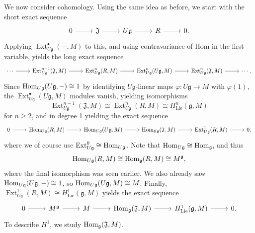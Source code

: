 We now consider cohomology. Using the same idea as before, we start with the short exact sequence
\[\begin{tikzcd}[row sep = 2.5em, column sep = 2.5em]
0\ar[r]  & \mathfrak{J} \ar[r]  & U\mathfrak{g} \ar[r]  & R\ar[r]  & 0.
\end{tikzcd}\]
Applying $\operatorname{Ext}_{U\mathfrak{g} } ^{\bullet} (-,M)$ to this, and using contravariance of Hom in the first variable, yields the long exact sequence
\[\begin{tikzcd}[row sep = 2.5em, column sep = 2.5em]
	\cdots \ar[r]  & \operatorname{Ext}_{U\mathfrak{g} } ^{n-1} (\mathfrak{J} ,M)\ar[r]  & \operatorname{Ext} _{U\mathfrak{g} }^n(R ,M)\ar[r]  & \operatorname{Ext} _{U\mathfrak{g} } ^n(U\mathfrak{g} ,M)\ar[r]  & \operatorname{Ext} ^{n}_{U\mathfrak{g} } (\mathfrak{J} ,M)\ar[r] & \cdots .
\end{tikzcd}\]
Since $\operatorname{Hom}_{U\mathfrak{g} }(U\mathfrak{g} , -) \cong 1$ by identifying $U\mathfrak{g} $-linear maps $\varphi : U\mathfrak{g} \to M$ with $\varphi (1)$, the $\operatorname{Ext} ^{\bullet} _{U\mathfrak{g} } (U\mathfrak{g} ,M)$ modules vanish, yielding isomorphisms
\[
	\operatorname{Ext}_{U\mathfrak{g} } ^{n-1} (\mathfrak{J},M) \cong \operatorname{Ext} ^n_{U\mathfrak{g} } (R,M)\cong H^n_{\mathrm{Lie} } (\mathfrak{g} ,M)
\]
for $n\geq 2$, and in degree 1 yielding the exact sequence
\[\begin{tikzcd}[row sep = 2.5em, column sep = 2.5em]
0\ar[r]  & \Hom_{U\mathfrak{g} } (R, M)  \ar[r]  & \Hom_{U\mathfrak{g} } (U\mathfrak{g} , M) \ar[r]  & \Hom_\mathfrak{Ug} (\mathfrak{J} , M) \ar[r]  & \operatorname{Ext}_{U\mathfrak{g}} ^1(R,M)\ar[r]  & 0,
\end{tikzcd}\]
where we of course use $\operatorname{Ext}^0_{U\mathfrak{g} } \cong \operatorname{Hom}_{U\mathfrak{g} } $. Note that $\operatorname{Hom}_{U\mathfrak{g} } \cong \operatorname{Hom}_\mathfrak{g} $, and thus
\[
	\operatorname{Hom}_{U\mathfrak{g} } (R, M) \cong \operatorname{Hom}_\mathfrak{g} (R, M) \cong M^\mathfrak{g} ,
\]
where the final isomorphism was seen earlier. We also already saw $\operatorname{Hom}_{U\mathfrak{g} } (U\mathfrak{g} , -) \cong 1$, so $\operatorname{Hom}_{U\mathfrak{g} } (U\mathfrak{g} , M) \cong M$. Finally, $\operatorname{Ext} ^1_{U\mathfrak{g} } (R,M)\cong H^1_{\mathrm{Lie} } (\mathfrak{g} ,M)$ yields the exact sequence
\[\begin{tikzcd}[row sep = 2.5em, column sep = 2.5em]
0\ar[r]  & M^\mathfrak{g} \ar[r]  & M\ar[r]  & \Hom_\mathfrak{g} (\mathfrak{J} , M) \ar[r]  & H^1_{\mathrm{Lie} } (\mathfrak{g} ,M)\ar[r]  & 0.
\end{tikzcd}\]
To describe $H^1$, we study $\operatorname{Hom}_\mathfrak{g} (\mathfrak{J} , M) $.

